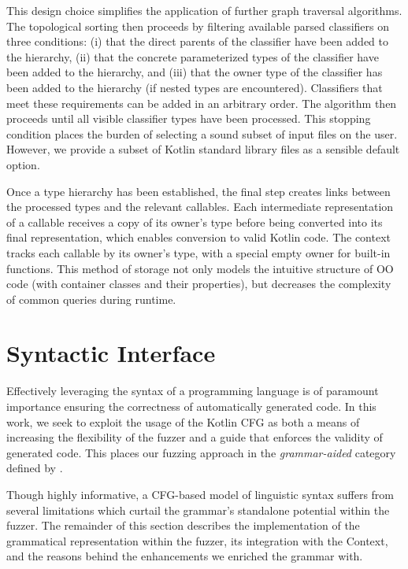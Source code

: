 This design choice simplifies the application of further graph traversal algorithms.
The topological sorting then proceeds by filtering available parsed classifiers on three conditions: (i) that the direct parents of the classifier have been added to the hierarchy, (ii) that the concrete parameterized types of the classifier have been added to the hierarchy, and (iii) that the owner
type of the classifier has been added to the hierarchy (if nested types are encountered).
Classifiers that meet these requirements can be added in an arbitrary order.
The algorithm then proceeds until all visible classifier types have been processed.
This stopping condition places the burden of selecting a sound
subset of input files on the user.
However, we provide a subset of Kotlin standard library files as
a sensible default option.

Once a type hierarchy has been established, the final step creates links between the
processed types and the relevant callables.
Each intermediate representation of a callable receives a copy of its owner's type
before being converted into its final representation, which enables conversion to
valid Kotlin code.
The context tracks each callable by its owner's type, with a special empty owner for built-in 
functions.
This method of storage not only models the intuitive structure of \Gls{OO} code 
(with container classes and their properties), but decreases the complexity of
common queries during runtime.

\section{\label{sec:syntax}Syntactic Interface}

Effectively leveraging the syntax of a programming language is of paramount importance
ensuring the correctness of automatically generated code.
In this work, we seek to exploit the usage of the Kotlin \gls{CFG} as both a means of increasing
the flexibility of the fuzzer and a guide that enforces the validity of generated code.
This places our fuzzing approach in the \textit{grammar-aided} category defined by 
\citet{chen2020survey}.

Though highly informative, a \gls{CFG}-based model of linguistic syntax
suffers from several limitations which
curtail the grammar's standalone potential within the fuzzer.
The remainder of this section describes the
implementation of the grammatical representation
within the fuzzer, its integration with the Context,
and the reasons behind the enhancements
we enriched the grammar with.

